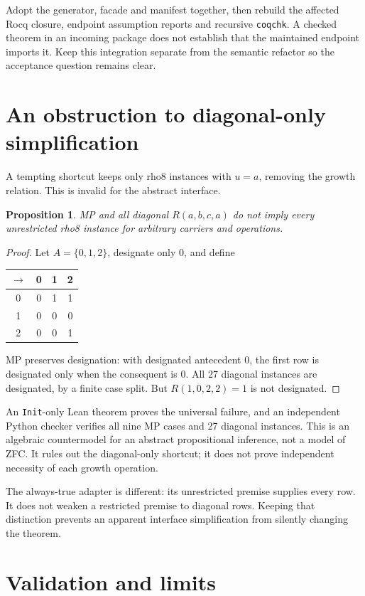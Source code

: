 \documentclass[11pt,letterpaper]{article}
\newcommand{\code}[1]{\texttt{#1}}
\newtheorem{proposition}[theorem]{Proposition}
\begin{document}
Adopt the generator, facade and manifest together, then rebuild the affected
Rocq closure, endpoint assumption reports and recursive \code{coqchk}. A checked
theorem in an incoming package does not establish that the maintained endpoint
imports it. Keep this integration separate from the semantic refactor so the
acceptance question remains clear.

\section{An obstruction to diagonal-only simplification}

A tempting shortcut keeps only rho8 instances with \(u=a\), removing the
growth relation. This is invalid for the abstract interface.

\begin{proposition}
MP and all diagonal \(R(a,b,c,a)\) do not imply every unrestricted rho8 instance
for arbitrary carriers and operations.
\end{proposition}
\begin{proof}
Let \(A=\{0,1,2\}\), designate only \(0\), and define
\begin{center}
\begin{tabular}{c|ccc}
\(\to\)&0&1&2\\ \hline
0&0&1&1\\
1&0&0&0\\
2&0&0&1
\end{tabular}
\end{center}
MP preserves designation: with designated antecedent \(0\), the first row
is designated only when the consequent is \(0\). All 27 diagonal instances are
designated, by a finite case split. But \(R(1,0,2,2)=1\) is not designated.
\end{proof}

An \code{Init}-only Lean theorem proves the universal failure, and an independent
Python checker verifies all nine MP cases and 27 diagonal instances. This is
an algebraic countermodel for an abstract propositional inference, not a model
of ZFC. It rules out the diagonal-only shortcut; it does not prove independent
necessity of each growth operation.

The always-true adapter is different: its unrestricted premise supplies every
row. It does not weaken a restricted premise to diagonal rows. Keeping that
distinction prevents an apparent interface simplification from silently changing
the theorem.

\section{Validation and limits}
\end{document}
